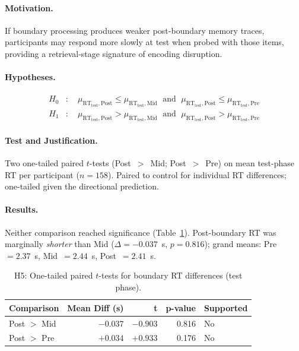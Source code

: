 \documentclass[10pt,a4paper]{article}
\begin{document}
\paragraph{Motivation.}
If boundary processing produces weaker post-boundary memory traces, participants may respond more slowly at test when probed with those items, providing a retrieval-stage signature of encoding disruption.

\paragraph{Hypotheses.}
\begin{align*}
  H_0 &:\quad \mu_{\mathrm{RT_{test},Post}} \leq \mu_{\mathrm{RT_{test},Mid}}
             \;\text{ and }\;
             \mu_{\mathrm{RT_{test},Post}} \leq \mu_{\mathrm{RT_{test},Pre}} \\
  H_1 &:\quad \mu_{\mathrm{RT_{test},Post}} > \mu_{\mathrm{RT_{test},Mid}}
             \;\text{ and }\;
             \mu_{\mathrm{RT_{test},Post}} > \mu_{\mathrm{RT_{test},Pre}}
\end{align*}

\paragraph{Test and Justification.}
Two one-tailed paired $t$-tests (Post~$>$~Mid; Post~$>$~Pre) on mean test-phase RT per participant ($n{=}158$). Paired to control for individual RT differences; one-tailed given the directional prediction.

\paragraph{Results.}
Neither comparison reached significance (Table~\ref{tab:h5}). Post-boundary RT was marginally \emph{shorter} than Mid ($\Delta{=}{-}0.037$~s, $p{=}0.816$); grand means: Pre~$=2.37$~s, Mid~$=2.44$~s, Post~$=2.41$~s.

\begin{table}[H]
\centering
\caption{H5: One-tailed paired $t$-tests for boundary RT differences (test phase).}
\label{tab:h5}
\begin{tabular}{lrrrl}
\toprule
\textbf{Comparison} & \textbf{Mean Diff (s)} & \textbf{t} & \textbf{p-value} & \textbf{Supported} \\
\midrule
Post $>$ Mid & $-0.037$ & $-0.903$ & 0.816 & No \\
Post $>$ Pre & $+0.034$ & $+0.933$ & 0.176 & No \\
\bottomrule
\end{tabular}
\end{table}
\end{document}
